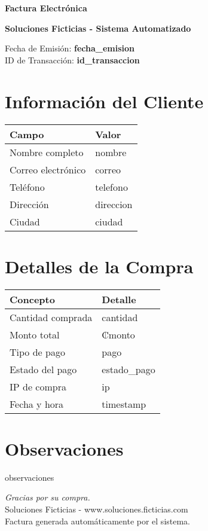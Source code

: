 \documentclass[12pt]{article}
\begin{document}
\begin{center}
    \Huge \textbf{Factura Electrónica}

    \vspace{0.3cm}
    \large \textbf{Soluciones Ficticias - Sistema Automatizado}

    \vspace{0.5cm}
    \normalsize Fecha de Emisión: \textbf{{fecha_emision}} \\
    ID de Transacción: \textbf{{id_transaccion}} \\
\end{center}

\vspace{1cm}

\section*{Información del Cliente}
\begin{tabularx}{\textwidth}{L{4cm} L{12cm}}
\textbf{Campo} & \textbf{Valor} \\
\hline
Nombre completo & {nombre} \\
Correo electrónico & {correo} \\
Teléfono & {telefono} \\
Dirección & {direccion} \\
Ciudad & {ciudad} \\
\end{tabularx}

\vspace{0.8cm}

\section*{Detalles de la Compra}
\begin{tabularx}{\textwidth}{L{6cm} L{10cm}}
\textbf{Concepto} & \textbf{Detalle} \\
\hline
Cantidad comprada & {cantidad} \\
Monto total & ₡{monto} \\
Tipo de pago & {pago} \\
Estado del pago & {estado_pago} \\
IP de compra & {ip} \\
Fecha y hora & {timestamp} \\
\end{tabularx}

\vspace{1.5cm}

\section*{Observaciones}
{observaciones}

\vfill

\begin{center}
    \textit{Gracias por su compra.} \\
    Soluciones Ficticias - www.soluciones.ficticias.com \\
    Factura generada automáticamente por el sistema.
\end{center}
\end{document}
